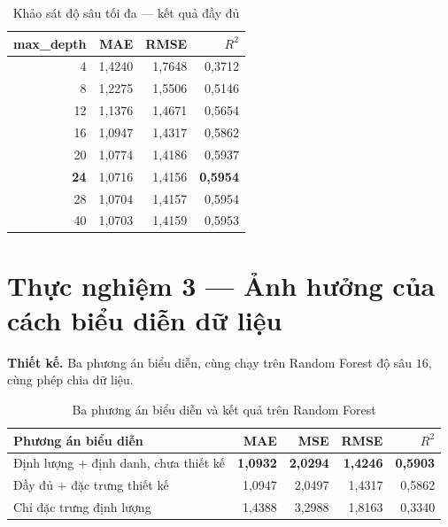 \begin{table}[H]
\centering
\caption{Khảo sát độ sâu tối đa --- kết quả đầy đủ}
\label{tab:depth-hou}
\small
\begin{tabular}{@{}rrrr@{}}
\toprule
\textbf{max\_depth} & \textbf{MAE} & \textbf{RMSE} & \textbf{$R^2$} \\
\midrule
4  & 1{,}4240 & 1{,}7648 & 0{,}3712 \\
8  & 1{,}2275 & 1{,}5506 & 0{,}5146 \\
12 & 1{,}1376 & 1{,}4671 & 0{,}5654 \\
16 & 1{,}0947 & 1{,}4317 & 0{,}5862 \\
20 & 1{,}0774 & 1{,}4186 & 0{,}5937 \\
\textbf{24} & 1{,}0716 & 1{,}4156 & \textbf{0{,}5954} \\
28 & 1{,}0704 & 1{,}4157 & 0{,}5954 \\
40 & 1{,}0703 & 1{,}4159 & 0{,}5953 \\
\bottomrule
\end{tabular}
\end{table}


\section{Thực nghiệm 3 --- Ảnh hưởng của cách biểu diễn dữ liệu}
\label{sec:tn3-hou}

\textbf{Thiết kế.} Ba phương án biểu diễn, cùng chạy trên Random Forest độ sâu
$16$, cùng phép chia dữ liệu.

\begin{table}[H]
\centering
\caption{Ba phương án biểu diễn và kết quả trên Random Forest}
\label{tab:rep-hou}
\small
\begin{tabular}{@{}lrrrr@{}}
\toprule
\textbf{Phương án biểu diễn} & \textbf{MAE} & \textbf{MSE} & \textbf{RMSE} & \textbf{$R^2$} \\
\midrule
Định lượng $+$ định danh, chưa thiết kế & \textbf{1{,}0932} & \textbf{2{,}0294} & \textbf{1{,}4246} & \textbf{0{,}5903} \\
Đầy đủ $+$ đặc trưng thiết kế           & 1{,}0947 & 2{,}0497 & 1{,}4317 & 0{,}5862 \\
Chỉ đặc trưng định lượng                & 1{,}4388 & 3{,}2988 & 1{,}8163 & 0{,}3340 \\
\bottomrule
\end{tabular}
\end{table}

